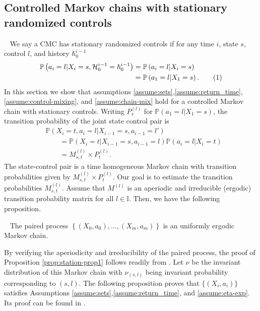 \documentclass[opre,sglanonrev]{informs4}
\numberwithin{equation}{section}
\newcommand{\pow}[1]{^{(#1)}}
\newcommand{\lp}{\left(}
\newcommand{\rp}{\right)}
\newcommand{\History}{\mathcal{H}}
\newcommand{\history}{\hbar}
\newcommand{\Ibb}{\mathbb{I}}
\newcommand{\Pbb}{\mathbb{P}}
\newcommand{\indexeddata}{\left\{(X_0,a_0),\dots,(X_m,a_m)\right\}}
\newcommand\numberthis{\addtocounter{equation}{1}\tag{\theequation}}
\newcommand{\prob}{\Pbb}
\newcommand{\probl}{\prob}
\begin{document}
{{\subsection{Controlled Markov chains with stationary randomized controls}~\label{sec:example-stationary}
We say a CMC has stationary randomized controls if for any time $i$, state $s$, control $l$, and history $\history_0^{i-1}$ 
\begin{align*}
\probl\lp a_i=l|X_i=s,\History_0^{i-1}=\history_0^{i-1}\rp & =\probl\lp a_i=l|X_i=s \rp\\
&=\probl\lp a_1=l|X_1=s \rp.\numberthis\label{eq:stationary-eq1}    
\end{align*}
In this section we show that assumptions \ref{assume:sets},\ref{assume:return_time}, \ref{assume:control-mixing}, and \ref{assume:chain-mix} hold for a controlled Markov chain with stationary controls. Writing $P_s^{(l)}$ for $\prob\left(a_1=l|X_{1}=s\right)$,  the transition probability of the joint state control pair is
\begin{align*}
    & \prob\left(X_i=t,a_i=l|X_{i-1}=s,a_{i-1}=l'\right)\\
    &\qquad = \prob\left(X_i=t|X_{i-1}=s,a_{i-1}=l\right)\prob(a_i=l|X_i=t)\\
    &\qquad = M_{s,t}^{(l)}\times P_t^{(l)}.
\end{align*}
The state-control pair is a time homogeneous Markov chain with transition probabilities given by $M_{s,t}^{(l)}\times P_t^{(l)}$. 
Our goal is to estimate the transition probabilities $M^{(l)}_{s,t}$. %
Assume that $M\pow{l}$ is an aperiodic and irreducible (ergodic) transition probability matrix for all $l\in\Ibb$. Then, we have the following proposition. 
\begin{proposition}~\label{prop:station-prop1}
The paired process $\indexeddata$ is an uniformly ergodic Markov chain.
\end{proposition}
\vspace{-0.2 cm}
By verifying the aperiodicity and irreducibility of the paired process, the proof of Proposition \ref{prop:station-prop1} follows readily from \citet[Theorem 16.0.2]{meyntweedie}.
Let $\nu$ be the invariant distribution of this Markov chain with $\nu_{(s,l)}$ being invariant probability corresponding to $(s,l)$. 
{The following proposition proves that $\{(X_i,a_i)\}$ satisfies Assumptions \ref{assume:sets},\ref{assume:return_time}, and \ref{assume:eta-exp}. Its proof can be found in .}

}}
\end{document}
